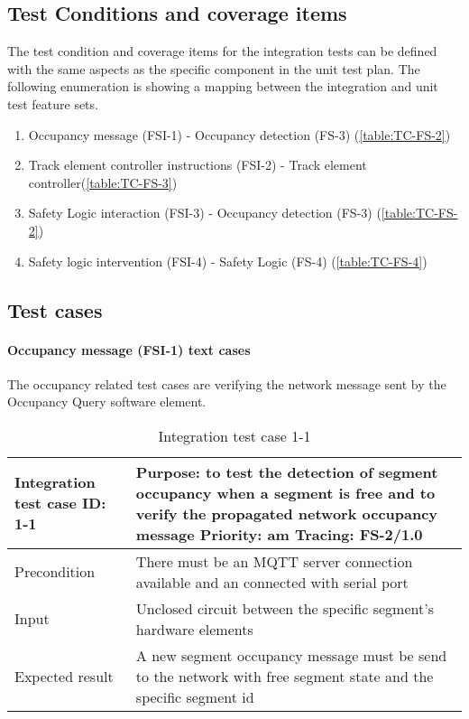 \subsection{Test Conditions and coverage items}
The test condition and coverage items for the integration tests can be defined with the same aspects as the specific component in the unit test plan.
The following enumeration is showing a mapping between the integration and unit test feature sets.
\begin{enumerate}
	\item Occupancy message (FSI-1) - Occupancy detection (FS-3) (\ref{table:TC-FS-2})
	\item Track element controller instructions (FSI-2) - Track element controller(\ref{table:TC-FS-3})
	\item Safety Logic interaction (FSI-3) - Occupancy detection (FS-3) (\ref{table:TC-FS-2})
	\item Safety logic intervention (FSI-4) - Safety Logic (FS-4) (\ref{table:TC-FS-4})
\end{enumerate}

\subsection{Test cases}
\paragraph{Occupancy message (FSI-1) text cases} The occupancy related test cases are verifying the network message sent by the Occupancy Query software element.
\begin{table}[H]
	\caption{Integration test case 1-1}
	\label{table:TCase-FSI1-01}
	\begin{center}
		\renewcommand{\arraystretch}{1.8}
		\begin{tabu} 
			to 0.9 \textwidth
			{  X[0.3, l] X[l] }
			\toprule
			Integration test case ID: 1-1 & Purpose: to test the detection of segment occupancy when a segment is free and to verify the propagated network occupancy message \newline Priority: am \newline Tracing: FS-2/1.0 \\ \midrule
			Precondition                  & There must be an MQTT server connection available and an connected with serial port                                                                                                \\
			Input                         & Unclosed circuit between the specific segment's hardware elements                                                                                                                  \\
			Expected result               & A new segment occupancy message must be send to the network with free segment state  and the specific segment id                                                                   \\ \bottomrule
		\end{tabu}
	\end{center}
\end{table} 


